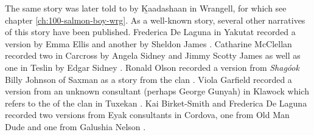 The same story was later told to \citeauthor{swanton:1909} by Ḵaadashaan in Wrangell, for which see chapter \ref{ch:100-salmon-boy-wrg}.
As a well-known story, several other narratives of this story have been published.
Frederica De Laguna in Yakutat recorded a version by  Emma Ellis and another by  Sheldon James \parencite[889–890]{de-laguna:1972}.
Catharine McClellan recorded two in Carcross by  Angela Sidney \parencite[279–282]{mcclellan-cruikshank:2007b} and  Jimmy Scotty James \parencite[413–415]{mcclellan-cruikshank:2007b} as well as one in Teslin by  Edgar Sidney \parencite[765–773]{mcclellan-cruikshank:2007c}.
Ronald Olson recorded a version from \textit{Shagóok} Billy Johnson of Saxman as a story from the  clan \parencite[34–35]{olson:1967}.
Viola Garfield recorded a version from an unknown consultant (perhaps  George Gunyah) in Klawock which refers to the  of the  clan in Tuxekan \parencite[146–147]{garfield-forrest:1948}.
Kai Birket-Smith and Frederica De Laguna recorded two versions from Eyak consultants in Cordova, one from Old Man Dude \parencite[274]{birket-smith-de-laguna:1938} and one from Galushia Nelson \parencite[272–273]{birket-smith-de-laguna:1938}.


\clearpage
\clearpage
\setlength{\Lcolwidth}{0.471875\textwidth}
\setlength{\Rcolwidth}{0.490625\textwidth}

